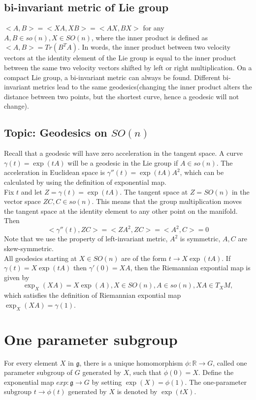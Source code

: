 \begin{refsection}
\subsection{bi-invariant metric of Lie group}
$<A,B> = <XA,XB> = <AX,BX>$ for any $A,B \in so(n), X\in SO(n)$, where the inner product is defined as $<A,B>=Tr(B^T A)$. In words, the inner product between two velocity vectors at the identity element of the Lie group is equal to the inner product between the same two velocity vectors shifted by left or right multiplication. On a compact Lie group, a bi-invariant metric can always be found. Different bi-invariant metrics lead to the same geodesics(changing the inner product alters the distance between two points, but the shortest curve, hence a geodesic will not change).\cite{Manton2013}

\subsection{Topic: Geodesics on $SO(n)$}
Recall that a geodesic will have zero acceleration in the tangent space. A curve $\gamma(t) = \exp(tA)$ will be a geodesic in the Lie group if $A \in so(n)$. The acceleration in Euclidean space is $\gamma''(t)=\exp(tA)A^2$, which can be calculated by using the definition of exponential map. \\
Fix $t$ and let $Z=\gamma(t) = \exp(tA)$. The tangent space at $Z=SO(n)$ in the vector space $ZC, C\in so(n)$. This means that the group multiplication moves the tangent space at the identity element to any other point on the manifold. Then $$<\gamma''(t),ZC>=<ZA^2,ZC> = <A^2,C>=0$$ Note that we use the property of left-invariant metric, $A^2$ is symmetric, $A,C$ are skew-symmetric.\\
All geodesics starting at $X \in SO(n)$ are of the form $t\rightarrow X\exp(tA)$. If $\gamma(t) = X\exp(tA)$ then $\gamma'(0)=XA$, then the Riemannian expontial map is given by
$$\exp_X(XA) = X\exp(A),X\in SO(n), A\in so(n), XA\in T_XM,$$ which satisfies the definition of Riemannian expontial map $\exp_X(XA)=\gamma(1)$.  \cite{Manton2013}





\section{One parameter subgroup}
\begin{definition}
For every element $X$ in $\mathfrak{g}$, there is a unique homomorphism $\phi : \mathbb{R}\rightarrow G$, called one parameter subgroup of $G$ generated by $X$, such that $\dot{\phi}(0)=X$. Define the exponential map $exp:\mathfrak{g}\rightarrow G$ by setting $\exp(X)=\phi(1)$. The one-parameter subgroup $t\rightarrow \phi(t)$ generated by $X$ is denoted by $\exp(t X)$. 
\end{definition}




\end{refsection}
